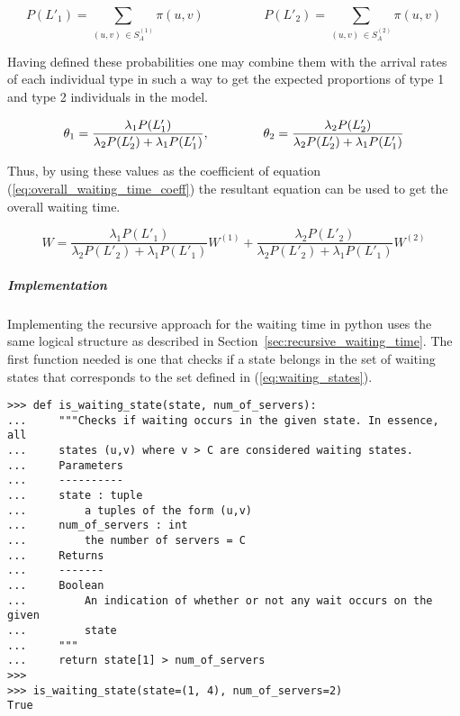 \begin{equation*}
    P(L'_1) = \sum_{(u,v) \, \in S_A^{(1)}} \pi(u,v) \hspace{2cm}
    P(L'_2) = \sum_{(u,v) \, \in S_A^{(2)}} \pi(u,v)
\end{equation*}


Having defined these probabilities one may combine them with the arrival rates
of each individual type in such a way to get the expected proportions of type 1
and type 2 individuals in the model.

\begin{equation}
    \theta_1 = \frac{\lambda_1 P(L'_1)}{\lambda_2 P(L'_2) + \lambda_1 P(L'_1)},
    \hspace{1.5cm}
    \theta_2 = \frac{\lambda_2 P(L'_2)}{\lambda_2 P(L'_2) + \lambda_1 P(L'_1)}
\end{equation}

Thus, by using these values as the coefficient of equation
(\ref{eq:overall_waiting_time_coeff})
the resultant equation can be used to get the overall waiting time.

\begin{equation}\label{eq:overall_waiting_time}
    W = \frac{\lambda_1 P(L'_1)}{\lambda_2 P(L'_2) + \lambda_1 P(L'_1)} W^{(1)}
    + \frac{\lambda_2 P(L'_2)}{\lambda_2 P(L'_2) + \lambda_1 P(L'_1)} W^{(2)}
\end{equation}


\subparagraph{Implementation}\label{sec:waiting_recursive_implementation}

Implementing the recursive approach for the waiting time in python uses the
same logical structure as described in Section~\ref{sec:recursive_waiting_time}.
The first function needed is one that checks if a state belongs in the
set of waiting states that corresponds to the set defined in
(\ref{eq:waiting_states}).

\begin{lstlisting}[style=pystyle]
>>> def is_waiting_state(state, num_of_servers):
...     """Checks if waiting occurs in the given state. In essence, all
...     states (u,v) where v > C are considered waiting states.
...     Parameters
...     ----------
...     state : tuple
...         a tuples of the form (u,v)
...     num_of_servers : int
...         the number of servers = C
...     Returns
...     -------
...     Boolean
...         An indication of whether or not any wait occurs on the given
...         state
...     """
...     return state[1] > num_of_servers
>>>
>>> is_waiting_state(state=(1, 4), num_of_servers=2)
True

\end{lstlisting}


